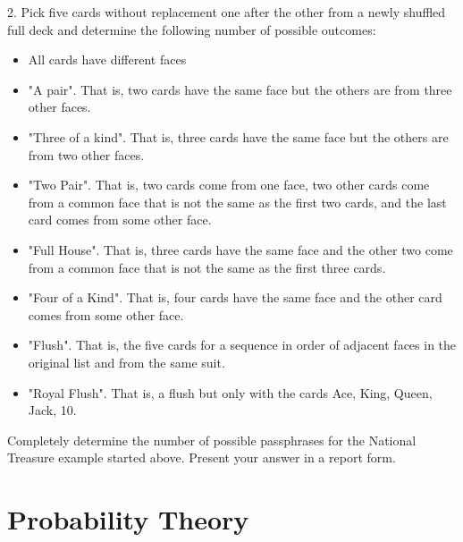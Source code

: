 \documentclass[10pt,]{book}
\theoremstyle{plain}
\theoremstyle{definition}
\theoremstyle{definition}
\theoremstyle{definition}
\numberwithin{equation}{section}
\begin{document}
2.  Pick five cards without replacement one after the other from a newly shuffled full deck and determine the following number of possible outcomes:
\leavevmode%
\begin{itemize}[label=\textbullet]
\item{}All cards have different faces%
\item{}"A pair". That is, two cards have the same face but the others are from three other faces.%
\item{}"Three of a kind".  That is, three cards have the same face but the others are from two other faces.%
\item{}"Two Pair". That is, two cards come from one face, two other cards come from a common face that is not the same as the first two cards, and the last card comes from some other face.%
\item{}"Full House". That is, three cards have the same face and the other two come from a common face that is not the same as the first three cards.%
\item{}"Four of a Kind". That is, four cards have the same face and the other card comes from some other face.%
\item{}"Flush". That is, the five cards for a sequence in order of adjacent faces in the original list and from the same suit.%
\item{}"Royal Flush". That is, a flush but only with the cards {Ace, King, Queen, Jack, 10}.%
\end{itemize}

%
\par
Completely determine the number of possible passphrases for the National Treasure example started above. Present your answer in a report form.%
\typeout{************************************************}
\typeout{************************************************}
\chapter[{Probability Theory}]{Probability Theory}\label{ProbabilityGeneralities}
\typeout{************************************************}
\typeout{************************************************}
\end{document}
